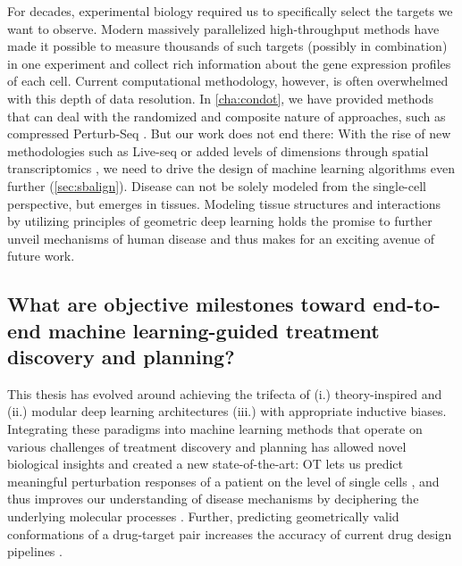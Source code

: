 For decades, experimental biology required us to specifically select the targets we want to observe. Modern massively parallelized high-throughput methods have made it possible to measure thousands of such targets (possibly in combination) in one experiment and collect rich information about the gene expression profiles of each cell.
Current computational methodology, however, is often overwhelmed with this depth of data resolution.
In \cref{cha:condot}, we have provided methods that can deal with the randomized and composite nature of approaches, such as compressed Perturb-Seq \cite{dixit2016perturb, cleary2017efficient, cleary2020necessity, roohani2022gears}.
But our work does not end there: With the rise of new methodologies such as Live-seq \citep{chen2022live} or added levels of dimensions through spatial transcriptomics \citep{marx2021method}, we need to drive the design of machine learning algorithms even further (\cref{sec:sbalign}). Disease can not be solely modeled from the single-cell perspective, but emerges in tissues. Modeling tissue structures and interactions by utilizing principles of geometric deep learning holds the promise to further unveil mechanisms of human disease and thus makes for an exciting avenue of future work.


\subsection*{\textbf{What are objective milestones toward end-to-end machine learning-guided treatment discovery and planning?}}

This thesis has evolved around achieving the trifecta of (i.) theory-inspired and (ii.) modular deep learning architectures (iii.) with appropriate inductive biases. Integrating these paradigms into machine learning methods that operate on various challenges of treatment discovery and planning has allowed novel biological insights and created a new state-of-the-art: OT lets us predict meaningful perturbation responses of a patient on the level of single cells \citep{bunne2021learning, bunne2022supervised}, and thus improves our understanding of disease mechanisms by deciphering the underlying molecular processes \citep{bunne2022proximal, bunne2022recovering}. Further, predicting geometrically valid conformations of a drug-target pair increases the accuracy of current drug design pipelines \citep{somnath2021multi, ganea2022independent, somnath2023aligned}. \\

